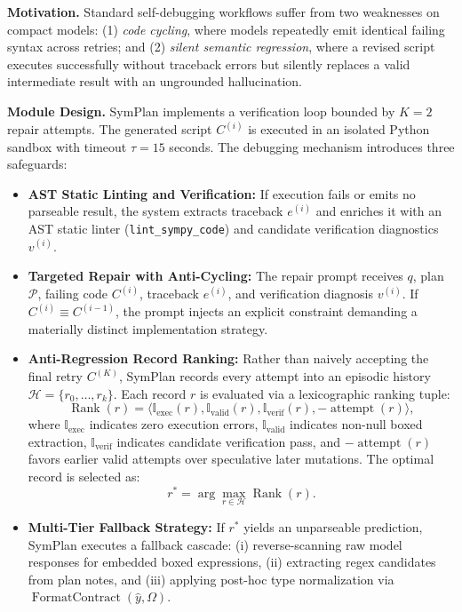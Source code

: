 \documentclass[runningheads]{llncs}
\begin{document}
\textbf{Motivation.} Standard self-debugging workflows suffer from two weaknesses on compact models: (1) \textit{code cycling}, where models repeatedly emit identical failing syntax across retries; and (2) \textit{silent semantic regression}, where a revised script executes successfully without traceback errors but silently replaces a valid intermediate result with an ungrounded hallucination.

\textbf{Module Design.} SymPlan implements a verification loop bounded by $K=2$ repair attempts. The generated script $C^{(i)}$ is executed in an isolated Python sandbox with timeout $\tau = 15$ seconds. The debugging mechanism introduces three safeguards:
\begin{itemize}
    \item \textbf{AST Static Linting and Verification:} If execution fails or emits no parseable result, the system extracts traceback $e^{(i)}$ and enriches it with an AST static linter (\texttt{lint\_sympy\_code}) and candidate verification diagnostics $v^{(i)}$.
    \item \textbf{Targeted Repair with Anti-Cycling:} The repair prompt receives $q$, plan $\mathcal{P}$, failing code $C^{(i)}$, traceback $e^{(i)}$, and verification diagnosis $v^{(i)}$. If $C^{(i)} \equiv C^{(i-1)}$, the prompt injects an explicit constraint demanding a materially distinct implementation strategy.
    \item \textbf{Anti-Regression Record Ranking:} Rather than naively accepting the final retry $C^{(K)}$, SymPlan records every attempt into an episodic history $\mathcal{H} = \{r_0, \ldots, r_k\}$. Each record $r$ is evaluated via a lexicographic ranking tuple:
    \begin{equation}
    \operatorname{Rank}(r) = \langle \mathbb{I}_{\text{exec}}(r), \mathbb{I}_{\text{valid}}(r), \mathbb{I}_{\text{verif}}(r), -\operatorname{attempt}(r) \rangle,
    \end{equation}
    where $\mathbb{I}_{\text{exec}}$ indicates zero execution errors, $\mathbb{I}_{\text{valid}}$ indicates non-null boxed extraction, $\mathbb{I}_{\text{verif}}$ indicates candidate verification pass, and $-\operatorname{attempt}(r)$ favors earlier valid attempts over speculative later mutations. The optimal record is selected as:
    \begin{equation}
    r^* = \arg\max_{r \in \mathcal{H}} \operatorname{Rank}(r).
    \end{equation}
    \item \textbf{Multi-Tier Fallback Strategy:} If $r^*$ yields an unparseable prediction, SymPlan executes a fallback cascade: (i) reverse-scanning raw model responses for embedded boxed expressions, (ii) extracting regex candidates from plan notes, and (iii) applying post-hoc type normalization via $\operatorname{FormatContract}(\hat{y}, \Omega)$.
\end{itemize}
\end{document}
